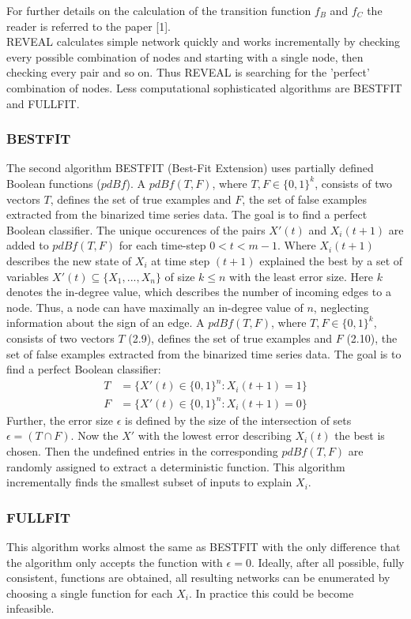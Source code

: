 For further details on the calculation of the transition function $f_{B}$ and $f_{C}$ the reader is referred to the paper [1].\\
REVEAL calculates simple network quickly and works incrementally by checking every possible combination of nodes and starting with a single node, then checking every pair and so on. Thus REVEAL is searching for the 'perfect' combination of nodes. Less computational sophisticated algorithms are BESTFIT and FULLFIT. 


\subsubsection*{BESTFIT}
The second algorithm BESTFIT (Best-Fit Extension) uses partially defined Boolean functions ($pdBf$). A $pdBf(T,F)$, where $T,F\in \{0,1\}^{k}$, consists of two vectors $T$, defines the set of true examples and $F$, the set of false examples extracted from the binarized time series data. The goal is to find a perfect Boolean classifier. The unique occurences of the pairs $X'(t)$ and $X_{i}(t+1)$ are added to $pdBf(T,F)$ for each time-step $0 < t < m-1$. Where $X_{i}(t+1)$ describes the new state of $X_{i}$ at time step $(t+1)$ explained the best by a set of variables $X'(t)\subseteq \{X_{1},...,X_{n}\}$ of size $k \le n$ with the least error size. Here $k$ denotes the in-degree value, which describes the number of incoming edges to a node. Thus, a node can have maximally an in-degree value of $n$, neglecting information about the sign of an edge. A $pdBf(T,F)$, where $T,F\in \{0,1\}^{k}$, consists of two vectors $T$ (2.9), defines the set of true examples and $F$ (2.10), the set of false examples extracted from the binarized time series data. The goal is to find a perfect Boolean classifier: 
\begin{align}
T & =\{X'(t)\in \{0,1\}^n : X_{i}(t+1)=1\}\\
F & =\{X'(t)\in \{0,1\}^n : X_{i}(t+1)=0\}
\end{align}
Further, the error size $ \epsilon $ is defined by the size of the intersection of sets $ \epsilon = (T \cap F)$. Now the $X'$ with the lowest error describing $X_{i}(t)$ the best is chosen. Then the undefined entries in the corresponding $pdBf(T,F)$ are randomly assigned to extract a deterministic function. This algorithm incrementally finds the smallest subset of inputs to explain $X_{i}$.



\subsubsection*{FULLFIT}
This algorithm works almost the same as BESTFIT with the only difference that the algorithm only accepts the function with $\epsilon = 0$. Ideally, after all possible, fully consistent, functions are obtained, all resulting networks can be enumerated by choosing a single function for each $X_{i}$. In practice this could be become infeasible.


